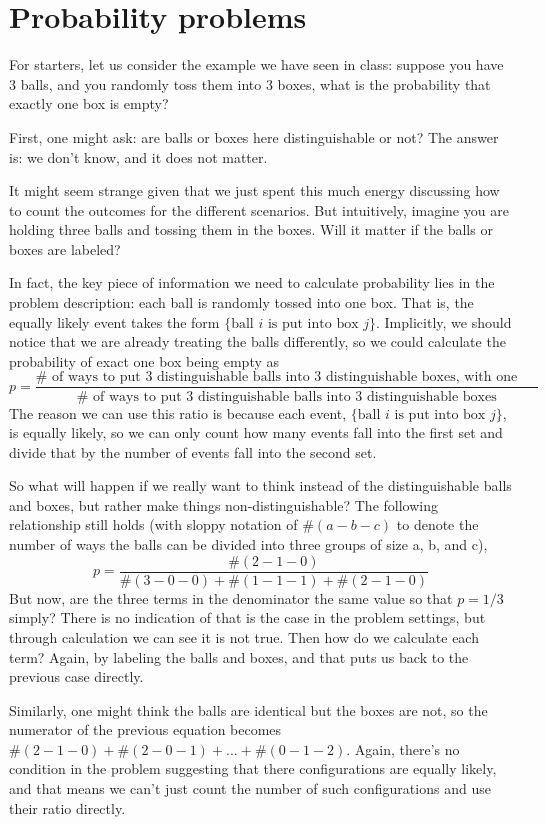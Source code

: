 \documentclass[12pt]{article}
\begin{document}
\section{Probability problems}
For starters, let us consider the example we have seen in class: suppose you have $3$ balls, and you randomly toss them into $3$ boxes, what is the probability that exactly one box is empty?

First, one might ask: are balls or boxes here distinguishable or not? The answer is: we don't know, and it does not matter. 

It might seem strange given that we just spent this much energy discussing how to count the outcomes for the different scenarios. But intuitively, imagine you are holding three balls and tossing them in the boxes. Will it matter if the balls or boxes are labeled?

In fact, the key piece of information we need to calculate probability lies in the problem description: each ball is randomly tossed into one box. That is, the equally likely event takes the form $\{\mbox{ball $i$ is put into box $j$}\}$. Implicitly, we should notice that we are already treating the balls differently, so we could calculate the probability of exact one box being empty as
\[
	p = \frac{\#\mbox{ of ways to put 3 distinguishable balls into 3 distinguishable boxes, with one empty}}{\# \mbox{ of ways to put 3 distinguishable balls into 3 distinguishable boxes}}
\]
The reason we can use this ratio is because each event, $\{\mbox{ball $i$ is put into box $j$}\}$, is equally likely, so we can only count how many events fall into the first set and divide that by the number of events fall into the second set. 

So what will happen if we really want to think instead of the distinguishable balls and boxes, but rather make things non-distinguishable? The following relationship still holds (with sloppy notation of $\#(a-b-c)$ to denote the number of ways the balls can be divided into three groups of size a, b, and c), 
\[
	p = \frac{\#(2-1-0)}{\#(3-0-0) + \#(1-1-1) + \#(2-1-0)}
\]
But now, are the three terms in the denominator the same value so that $p = 1/3$ simply? There is no indication of that is the case in the problem settings, but through calculation we can see it is not true. Then how do we calculate each term? Again, by labeling the balls and boxes, and that puts us back to the previous case directly. 

Similarly, one might think the balls are identical but the boxes are not, so the numerator of the previous equation becomes $\#(2-1-0) + \#(2-0-1) + ... + \#(0-1-2)$. Again, there's no condition in the problem suggesting that there configurations are equally likely, and that means we can't just count the number of such configurations and use their ratio directly.
\end{document}
